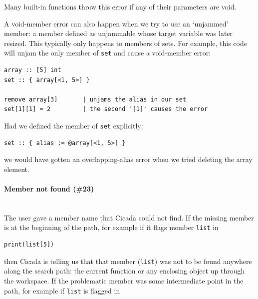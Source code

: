\documentclass{article}
\newenvironment{code}{
       \begin{list}{}{
               \setlength{\leftmargin}{.4in}
               \setlength{\rightmargin}{0in}
               \setlength{\topsep}{.2in}
       }
       \small
       \item[] }
       { \end{list}   }
\begin{document}
\noindent Many built-in functions throw this error if any of their parameters are void.

A void-member error can also happen when we try to use an `unjammed' member:  a member defined as unjammable whose target variable was later resized.  This typically only happens to members of sets.  For example, this code will unjam the only member of \verb#set# and cause a void-member error:

\begin{code} \begin{verbatim}
array :: [5] int
set :: { array[<1, 5>] }

remove array[3]       | unjams the alias in our set
set[1][1] = 2         | the second '[1]' causes the error  
\end{verbatim} \end{code}

\noindent Had we defined the member of \verb#set# explicitly:

\begin{code} \begin{verbatim}
set :: { alias := @array[<1, 5>] }
\end{verbatim} \end{code}

\noindent we would have gotten an overlapping-alias error when we tried deleting the array element.\\




\paragraph{Member not found (\#23)\\\\}

The user gave a member name that Cicada could not find.  If the missing member is at the beginning of the path, for example if it flags member \verb#list# in

\begin{code} \begin{verbatim}
print(list[5])
\end{verbatim} \end{code}

\noindent then Cicada is telling us that that member (\verb#list#) was not to be found anywhere along the search path:  the current function or any enclosing object up through the workspace.  If the problematic member was some intermediate point in the path, for example if \verb#list# is flagged in
\end{document}
